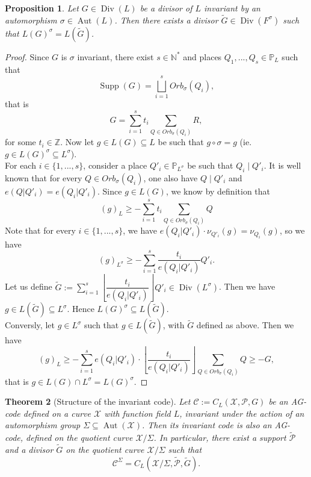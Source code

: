 \documentclass[10pt]{article}
\newtheorem{thm}{Theorem}
\newtheorem{prop1}[thm]{Proposition}
\newcommand{\s}{\vspace{0.3cm}}
\newcommand{\cd}{\cdot}
\newcommand{\N}{\mathbb{N}}
\newcommand{\Z}{\mathbb{Z}}
\newcommand{\PP}{\mathbb{P}}
\newcommand{\su}{\subseteq}
\newcommand{\X}{\mathcal{X}}
\newcommand{\PR}{\mathcal{P}}
\newcommand{\Div}{\operatorname{Div}}
\newcommand{\Supp}{\operatorname{Supp}}
\newcommand{\Aut}{\operatorname{Aut}}
\newcommand{\hugues}[1]{\textcolor{blue}{#1}}
\newcommand{\notehugues}[1]{\marginpar{\small\hugues{#1}}}
\begin{document}
\s

\begin{prop1} \label{invrr}
Let $G \in \Div(L)$ be a divisor of $L$ invariant by an automorphism $\sigma \in \Aut(L)$.
\notehugues{est-ce le même $\tilde{G}$ que dans la Déf.~\ref{pousséavant}~?}
Then there exists a divisor $\tilde{G} \in \Div(F^{\sigma})$ such that $L(G)^{\sigma} = L(\tilde{G})$.
\end{prop1}

\s

\begin{proof}
Since $G$ is $\sigma$ invariant, there exist $s \in \N^*$ and places $Q_1,...,Q_s \in \PP_L$ such that 
\[\Supp(G) = \bigsqcup_{i=1}^s Orb_{\sigma}(Q_i),\]
that is 
\[G = \sum\limits_{i=1}^s t_i \sum\limits_{Q \in Orb_{\sigma}(Q_i)} R,\]
for some $t_i \in \Z$. Now let $g \in L(G) \su L$ be such that $g \circ \sigma = g$ (ie. $g \in L(G)^{\sigma} \su L^{\sigma}$). \\
For each $i \in \{1,...,s\}$, consider a place $Q'_i \in \PP_{L^{\sigma}}$ be such that $Q_i \mid Q'_i$. It is well known that for every $Q \in Orb_{\sigma}(Q_i)$, one also have $Q \mid Q'_i$ and $e(Q|Q'_i)=e(Q_i|Q'_i)$. Since $g \in L(G)$, we know by definition that
\[(g)_L \geq - \sum\limits_{i=1}^s t_i \sum\limits_{Q \in Orb_{\sigma}(Q_i)} Q\]
Note that for every $i \in \{1,...,s\}$, we have $e(Q_i|Q'_i) \cd \nu_{Q'_i}(g) = \nu_{Q_i}(g)$, so we have 
\[(g)_{L^{\sigma}} \geq - \sum\limits_{i=1}^s \dfrac{t_i}{e(Q_i|Q'_i)}  Q'_i.\]
Let us define $\tilde{G}:= \sum\limits_{i=1}^s \left\lfloor\dfrac{t_i}{e(Q_i|Q'_i)}\right\rfloor  Q'_i \in \Div(L^{\sigma})$. Then we have $g \in L(\tilde{G}) \su L^{\sigma}$. Hence $L(G)^{\sigma} \su L(\tilde{G})$. \\
Conversly, let $g \in L^{\sigma}$ such that $g \in L(\tilde{G})$, with $\tilde{G}$ defined as above. Then we have 
\[ (g)_L \geq -\sum\limits_{i=1}^s e(Q_i|Q'_i) \cd \left\lfloor\dfrac{t_i}{e(Q_i|Q'_i)}\right\rfloor \sum\limits_{Q \in Orb_{\sigma}(Q_i)} Q \geq -G,\]
that is $g \in L(G) \cap L^{\sigma} = L(G)^{\sigma}$.
\end{proof}

\s

\begin{thm} [Structure of the invariant code] \label{invstruct}
Let $\mathcal{C} := C_L(\X,\PR,G)$ be an AG-code defined on a curve $\X$ with function field $L$, invariant under the action of an automorphism group $\Sigma \su \Aut(\X)$. Then its invariant code is also an AG-code, defined on the quotient curve $\X/\Sigma$. In particular, there exist a support $\tilde{\PR}$ and a divisor $\tilde{G}$ on the quotient curve $\X/\Sigma$ such that
\[\mathcal{C}^{\Sigma} = C_L(\X/\Sigma,\tilde{\PR},\tilde{G}).\]
\end{thm}
\end{document}
